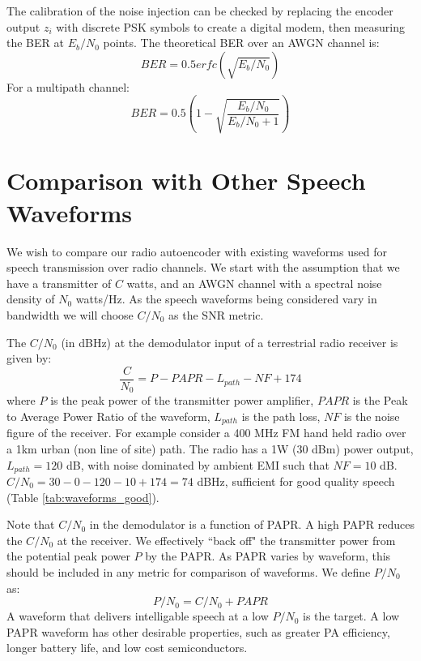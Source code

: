 \documentclass{article}
\begin{document}
The calibration of the noise injection can be checked by replacing the encoder output $z_i$ with discrete PSK symbols to create a digital modem, then measuring the BER at $E_b/N_0$ points. The theoretical BER over an AWGN channel is:
\begin{equation}
\label{eq:ber_awgn}
BER = 0.5erfc(\sqrt{E_b/N_0})
\end{equation}
For a multipath channel:
\begin{equation}
\label{eq:ber_multipath}
BER = 0.5 \left(1-\sqrt{\frac{E_b/N_0}{E_b/N_0+1}} \right)
\end{equation}

\section{Comparison with Other Speech Waveforms}

We wish to compare our radio autoencoder with existing waveforms used for speech transmission over radio channels.  We start with the assumption that we have a transmitter of $C$ watts, and an AWGN channel with a spectral noise density of $N_0$ watts/Hz. As the speech waveforms being considered vary in bandwidth we will choose $C/N_0$ as the SNR metric.

The $C/N_0$ (in dBHz) at the demodulator input of a terrestrial radio receiver is given by:
\begin{equation}
\frac{C}{N_0} = P - PAPR - L_{path} - NF + 174
\end{equation}
where $P$ is the peak power of the transmitter power amplifier, $PAPR$ is the Peak to Average Power Ratio of the waveform, $L_{path}$ is the path loss, $NF$ is the noise figure of the receiver.  For example consider a 400 MHz FM hand held radio over a 1km urban (non line of site) path.  The radio has a 1W (30 dBm) power output, $L_{path}=120$ dB, with noise dominated by ambient EMI such that $NF=10$ dB. $C/N_0 = 30 - 0 - 120 - 10 + 174 = 74$ dBHz, sufficient for good quality speech (Table \ref{tab:waveforms_good}).

Note that $C/N_0$ in the demodulator is a function of PAPR.  A high PAPR reduces the $C/N_0$ at the receiver.  We effectively ``back off" the transmitter power from the potential peak power $P$ by the PAPR.  As PAPR varies by waveform, this should be included in any metric for comparison of waveforms.  We define $P/N_0$ as:
\begin{equation}
P/N_0 = C/N_0 + PAPR
\end{equation} 
A waveform that delivers intelligable speech at a low $P/N_0$ is the target.  A low PAPR waveform has other desirable properties, such as greater PA efficiency, longer battery life, and low cost semiconductors.
\end{document}
